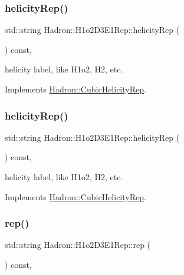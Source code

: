 \subsubsection{\texorpdfstring{helicityRep()}{helicityRep()}\hspace{0.1cm}{\footnotesize\ttfamily [2/3]}}
{\footnotesize\ttfamily std\+::string Hadron\+::\+H1o2\+D3\+E1\+Rep\+::helicity\+Rep (\begin{DoxyParamCaption}{ }\end{DoxyParamCaption}) const\hspace{0.3cm}{\ttfamily [inline]}, {\ttfamily [virtual]}}

helicity label, like H1o2, H2, etc. 

Implements \mbox{\hyperlink{structHadron_1_1CubicHelicityRep_af1096946b7470edf0a55451cc662f231}{Hadron\+::\+Cubic\+Helicity\+Rep}}.

\mbox{\label{structHadron_1_1H1o2D3E1Rep_a3bdf25355e5b97ee29fab2675ab309a5}} 
\subsubsection{\texorpdfstring{helicityRep()}{helicityRep()}\hspace{0.1cm}{\footnotesize\ttfamily [3/3]}}
{\footnotesize\ttfamily std\+::string Hadron\+::\+H1o2\+D3\+E1\+Rep\+::helicity\+Rep (\begin{DoxyParamCaption}{ }\end{DoxyParamCaption}) const\hspace{0.3cm}{\ttfamily [inline]}, {\ttfamily [virtual]}}

helicity label, like H1o2, H2, etc. 

Implements \mbox{\hyperlink{structHadron_1_1CubicHelicityRep_af1096946b7470edf0a55451cc662f231}{Hadron\+::\+Cubic\+Helicity\+Rep}}.

\mbox{\label{structHadron_1_1H1o2D3E1Rep_a06bc9c58f069a4734422133269965d64}} 
\subsubsection{\texorpdfstring{rep()}{rep()}\hspace{0.1cm}{\footnotesize\ttfamily [1/5]}}
{\footnotesize\ttfamily std\+::string Hadron\+::\+H1o2\+D3\+E1\+Rep\+::rep (\begin{DoxyParamCaption}{ }\end{DoxyParamCaption}) const\hspace{0.3cm}{\ttfamily [inline]}, {\ttfamily [virtual]}}



